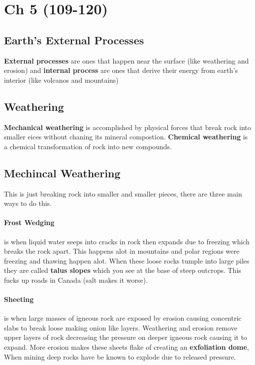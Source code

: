 \documentclass{article}
\begin{document}


\section*{Ch 5 (109-120)} %
\label{sec:ch_5_}
\subsection*{Earth's External Processes} %
\label{sub:earth_s_external_processes}
\textbf{External processes} are ones that happen near the surface (like weathering and erosion) and \textbf{internal process} are ones that derive their energy from earth's interior (like volcanos and mountains)

\subsection*{Weathering} %
\label{sub:weathering}
\textbf{Mechanical weathering} is accomplished by physical forces that break rock into smaller eices without chaning its mineral compostion. \textbf{Chemical weathering} is a chemical transformation of rock into new compounds.

\subsection*{Mechincal Weathering} %
\label{sub:mechincal_weathering}
This is just breaking rock into smaller and smaller pieces, there are three main ways to do this.

\paragraph{Frost Wedging} %
\label{par:frost_wedging}
is when liquid water seeps into cracks in rock then expands due to freezing which breaks the rock apart. This happens alot in mountains and polar regions were freezing and thawing happen alot. When these loose rocks tumple into large piles they are called \textbf{talus slopes} which you see at the base of steep outcrops. This fucks up roads in Canada (salt makes it worse).

\paragraph{Sheeting} %
\label{par:sheeting}
is when large masses of igneous rock are exposed by erosion causing concentric slabs to break loose making onion like layers. Weathering and erosion remove upper layers of rock decreasing the pressure on deeper igneous rock causing it to expand. More erosion makes these sheets flake of creating an \textbf{exfoliation dome}, When mining deep rocks have be known to explode due to released pressure.
\end{document}
